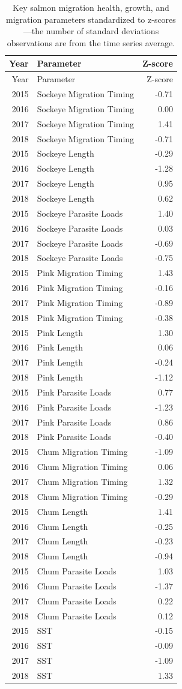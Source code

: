 \documentclass[fleqn,10pt]{wlpeerj} %
\begin{document}
\begin{longtable}[]{@{}rlr@{}}
\caption{\label{tab:z} Key salmon migration health, growth, and migration
parameters standardized to z-scores---the number of standard deviations
observations are from the time series average.}\tabularnewline
\toprule
Year & Parameter & Z-score\tabularnewline
\midrule
\endfirsthead
\toprule
Year & Parameter & Z-score\tabularnewline
\midrule
\endhead
2015 & Sockeye Migration Timing & -0.71\tabularnewline
2016 & Sockeye Migration Timing & 0.00\tabularnewline
2017 & Sockeye Migration Timing & 1.41\tabularnewline
2018 & Sockeye Migration Timing & -0.71\tabularnewline
2015 & Sockeye Length & -0.29\tabularnewline
2016 & Sockeye Length & -1.28\tabularnewline
2017 & Sockeye Length & 0.95\tabularnewline
2018 & Sockeye Length & 0.62\tabularnewline
2015 & Sockeye Parasite Loads & 1.40\tabularnewline
2016 & Sockeye Parasite Loads & 0.03\tabularnewline
2017 & Sockeye Parasite Loads & -0.69\tabularnewline
2018 & Sockeye Parasite Loads & -0.75\tabularnewline
2015 & Pink Migration Timing & 1.43\tabularnewline
2016 & Pink Migration Timing & -0.16\tabularnewline
2017 & Pink Migration Timing & -0.89\tabularnewline
2018 & Pink Migration Timing & -0.38\tabularnewline
2015 & Pink Length & 1.30\tabularnewline
2016 & Pink Length & 0.06\tabularnewline
2017 & Pink Length & -0.24\tabularnewline
2018 & Pink Length & -1.12\tabularnewline
2015 & Pink Parasite Loads & 0.77\tabularnewline
2016 & Pink Parasite Loads & -1.23\tabularnewline
2017 & Pink Parasite Loads & 0.86\tabularnewline
2018 & Pink Parasite Loads & -0.40\tabularnewline
2015 & Chum Migration Timing & -1.09\tabularnewline
2016 & Chum Migration Timing & 0.06\tabularnewline
2017 & Chum Migration Timing & 1.32\tabularnewline
2018 & Chum Migration Timing & -0.29\tabularnewline
2015 & Chum Length & 1.41\tabularnewline
2016 & Chum Length & -0.25\tabularnewline
2017 & Chum Length & -0.23\tabularnewline
2018 & Chum Length & -0.94\tabularnewline
2015 & Chum Parasite Loads & 1.03\tabularnewline
2016 & Chum Parasite Loads & -1.37\tabularnewline
2017 & Chum Parasite Loads & 0.22\tabularnewline
2018 & Chum Parasite Loads & 0.12\tabularnewline
2015 & SST & -0.15\tabularnewline
2016 & SST & -0.09\tabularnewline
2017 & SST & -1.09\tabularnewline
2018 & SST & 1.33\tabularnewline
\bottomrule
\end{longtable}
\end{document}
